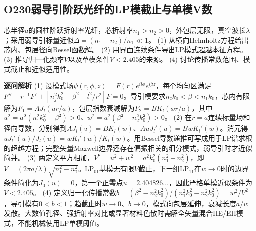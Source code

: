 \subsection*{O230\quad 弱导引阶跃光纤的LP模截止与单模V数}
芯半径$a$的圆柱阶跃折射率光纤，芯折射率$n_1>n_2>0$，外包层无限，真空波长$\lambda$；采用弱导引标量近似$\Delta=(n_1-n_2)/n_1\ll1$。
(1) 从横向Helmholtz方程给出芯内、包层径向Bessel函数解。
(2) 用界面连续条件导出LP模式超越本征方程。
(3) 推导归一化频率$V$以及单模条件$V<2.405$的来源。
(4) 讨论传播常数范围、模式截止和近似适用性。
\par\textbf{逐问解析}
(1) 设模式场$\psi(r,\phi,z)=F(r)e^{il\phi}e^{i\beta z}$，每个均匀区满足$F''+r^{-1}F'+[n_j^2k_0^2-\beta^2-l^2/r^2]F=0$。导引模要求$n_2k_0<\beta<n_1k_0$，芯内有限解为$F_1=A J_l(ur/a)$，包层指数衰减解为$F_2=B K_l(wr/a)$，其中$u^2=a^2(n_1^2k_0^2-\beta^2)>0$、$w^2=a^2(\beta^2-n_2^2k_0^2)>0$。
(2) 在$r=a$连续标量场和径向导数，分别得到$AJ_l(u)=BK_l(w)$、$A uJ_l'(u)=B w K_l'(w)$。消元得$uJ_l'(u)/J_l(u)=wK_l'(w)/K_l(w)$。用Bessel导数递推可写成用于LP谱求根的超越方程；完整矢量Maxwell边界还存在偏振相关的细分模式，弱导引时才近似简并。
(3) 两定义平方相加，$V^2=u^2+w^2=a^2k_0^2(n_1^2-n_2^2)$，即$V=(2\pi a/\lambda)\sqrt{n_1^2-n_2^2}$。LP$_{01}$基模无有限$V$截止，下一组LP$_{11}$在$w\to0$时的边界条件简化为$J_0(u)=0$，第一个正零点$u=2.404826\ldots$，因此严格单模近似条件为$V<2.405$。
(4) 定义归一化传播常数$b=(\beta^2-n_2^2k_0^2)/(n_1^2k_0^2-n_2^2k_0^2)=w^2/V^2$，导引模有$0<b<1$；趋截止时$w\to0$、$b\to0$，模式向包层延伸，衰减长度$a/w$发散。大数值孔径、强折射率对比或显著材料色散时需解全矢量混合HE/EH模式，不能机械使用LP单模阈值。
\par\medskip
